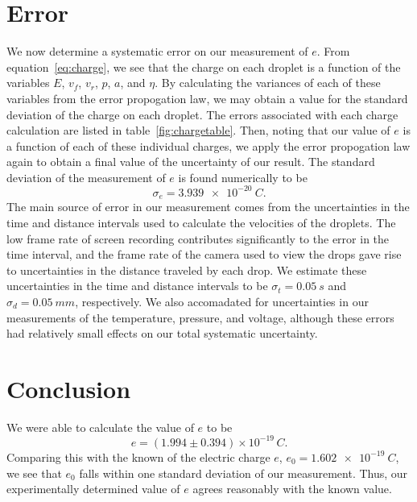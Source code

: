 \documentclass[aps, reprint,amsmath,amssymb]{revtex4-1} %
\begin{document}
\section{Error}
We now determine a systematic error on our measurement of $e$. From
equation~\eqref{eq:charge}, we see that the charge on each droplet is a function of the variables $E$, $v_f$, $v_r$, $p$, $a$, and $\eta$. By calculating the variances of each of these variables from the error propogation law, we may obtain a value for the standard deviation of the charge on each droplet. The errors associated with each charge calculation are listed in table~\ref{fig:chargetable}. Then, noting that our value of $e$ is a function of each of these individual charges, we apply the error propogation law again to obtain a final value of the uncertainty of our result. The standard deviation of the measurement of $e$ is found numerically to be
\[
    \sigma_e = \SI{3.939e-20}{C}.
\]
The main source of error in our measurement comes from the uncertainties in the time and distance intervals used to calculate the velocities of the droplets. The low frame rate of screen recording contributes significantly to the error in the time interval, and the frame rate of the camera used to view the drops gave rise to uncertainties in the distance traveled by each drop. We estimate these uncertainties in the time and distance intervals to be $\sigma_t = \SI{0.05}{s}$ and $\sigma_d = \SI{0.05}{mm}$, respectively. We also accomadated for uncertainties in our measurements of the temperature, pressure, and voltage, although these errors had relatively small effects on our total systematic uncertainty.
\section{Conclusion}

We were able to calculate the value of $e$ to be
\[
    e = (1.994 \pm 0.394) \times 10^{-19} \,\si{C}.
\]
Comparing this with the known of the electric charge $e$, $e_0 = \SI{1.602e-19}{C}$, we
see that $e_0$ falls within one standard deviation of our measurement.
Thus, our experimentally determined value of $e$ agrees reasonably with the
known value.
\end{document}
